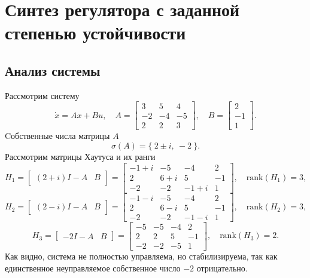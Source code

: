 \section{Синтез регулятора с заданной степенью устойчивости}

\subsection{Анализ системы}

Рассмотрим систему
\begin{equation}
    \dot x=Ax+Bu,\quad A=\begin{bmatrix}
        3&5&4\\
        -2&-4&-5\\
        2&2&3
    \end{bmatrix},\quad B=\begin{bmatrix}
        2\\-1\\1
    \end{bmatrix}.
    \label{eq:sys1}
\end{equation}
Cобственные числа матрицы $A$
\begin{equation*}
    \sigma(A)=\{\ 2\pm i,\ -2\ \}.
\end{equation*}
Рассмотрим матрицы Хаутуса и их ранги
\begin{equation*}
    H_1 = \begin{bmatrix}
        (2+ i) I - A & B
    \end{bmatrix} =
    \begin{bmatrix}
        -1 + i & -5 & -4 & 2 \\ 
         2 &  6 + i &  5 & -1 \\ 
        -2 & -2 & -1 + i &  1
    \end{bmatrix},
    \quad\text{rank}(H_1) = 3,
\end{equation*}
\begin{equation*}
    H_2 = \begin{bmatrix}
        (2- i) I - A & B
    \end{bmatrix} =
    \begin{bmatrix}
        -1 - i & -5 & -4 & 2 \\ 
         2 &  6 - i &  5 & -1 \\ 
        -2 & -2 & -1 - i &  1
    \end{bmatrix},
    \quad\text{rank}(H_2) = 3,
\end{equation*}
\begin{equation*}
    H_3 = \begin{bmatrix}
        -2 I - A & B
    \end{bmatrix} =
    \begin{bmatrix}
        -5 & -5 & -4 &  2 \\ 
         2 &  2 &  5 & -1 \\ 
        -2 & -2 & -5 &  1
    \end{bmatrix},
    \quad\text{rank}(H_3) = 2.
\end{equation*}
Как видно, система не полностью управляема, но стабилизируема, так как единственное
неуправляемое собственное число $-2$ отрицательно.

